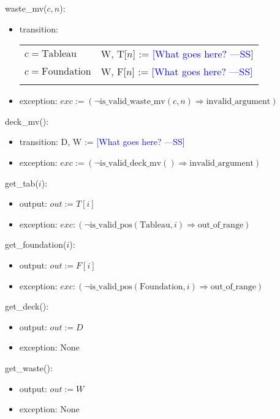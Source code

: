 \documentclass[12pt]{article}
\newcommand{\authornote}[3]{\textcolor{#1}{[#3 ---#2]}}
\newcommand{\authornote}[3]{}
\newcommand{\wss}[1]{\authornote{blue}{SS}{#1}}
\begin{document}
\noindent waste\_mv($c, n$):
\begin{itemize}
\item transition:

\begin{tabular}{|p{3cm}|l|}
\hhline{|-|-|}
$c = \mbox{Tableau}$ & W, T[$n$] := \wss{What goes here?}\\
\hhline{|-|-|}
$c = \mbox{Foundation}$ & W, F[$n$] := \wss{What goes here?}\\
\hhline{|-|-|}
\end{tabular}

\item exception:
  $exc := (\neg \text{is\_valid\_waste\_mv}(c, n) \Rightarrow
  \text{invalid\_argument})$

\end{itemize}

\noindent deck\_mv():
\begin{itemize}
\item transition: D, W := \wss{What goes here?}
\item exception:
  $exc := (\neg \text{is\_valid\_deck\_mv}() \Rightarrow \text{invalid\_argument})$
\end{itemize}

\noindent get\_tab($i$):
\begin{itemize}
\item output: $out := T[i]$
\item exception: $exc : (\neg \text{is\_valid\_pos}(\text{Tableau}, i) \Rightarrow \text{out\_of\_range})$
\end{itemize}

\noindent get\_foundation($i$):
\begin{itemize}
\item output: $out := F[i]$
\item exception: $exc : (\neg \text{is\_valid\_pos}(\text{Foundation}, i) \Rightarrow \text{out\_of\_range})$
\end{itemize}

\noindent get\_deck():
\begin{itemize}
\item output: $out := D$
\item exception: None
\end{itemize}

\noindent get\_waste():
\begin{itemize}
\item output: $out := W$
\item exception: None
\end{itemize}
\end{document}
